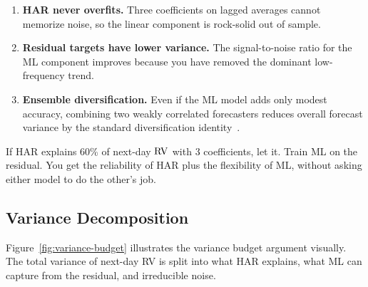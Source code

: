 \begin{enumerate}
  \item \textbf{HAR never overfits.}  Three coefficients on lagged
        averages cannot memorize noise, so the linear component is
        rock-solid out of sample.
  \item \textbf{Residual targets have lower variance.}  The signal-to-noise
        ratio for the ML component improves because you have removed the
        dominant low-frequency trend.
  \item \textbf{Ensemble diversification.}  Even if the ML model adds only
        modest accuracy, combining two weakly correlated forecasters reduces
        overall forecast variance by the standard diversification
        identity~\citep{RahimikiaPoon2020}.
\end{enumerate}

\begin{keyidea}
If HAR explains 60\% of next-day $\operatorname{RV}$ with 3 coefficients, let it.
Train ML on the residual.  You get the reliability of HAR plus the
flexibility of ML, without asking either model to do the other's job.
\end{keyidea}

\subsection{Variance Decomposition}

Figure~\ref{fig:variance-budget} illustrates the variance budget argument
visually.  The total variance of next-day RV is split into what HAR
explains, what ML can capture from the residual, and irreducible noise.

